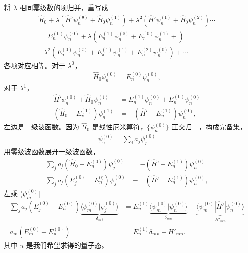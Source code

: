 将 $\lambda$ 相同幂级数的项归并，重写成
\begin{multline}
    \hat H_0 + \lambda \left(
        \hat H' \psi_n^{(0)} + \hat H_0 \psi_n^{(1)}
    \right) + \lambda^2 \left(
        \hat H' \psi_n^{(1)} + \hat H_0 \psi_n^{(2)}
    \right) \cdots \\ = 
    E_n^{(0)} \psi_n^{(0)} + \lambda \left(
        E_n^{(1)} \psi_n^{(0)} + E_n^{(0)} \psi_n^{(1)} + 
    \right) 
    \\+ \lambda^2 \left(
        E_n^{(0)} \psi_n^{(2)} +E_n^{(1)} \psi_n^{(1)} + E_n^{(2)} \psi_n^{(0)}
    \right) + \cdots
\end{multline}
各项对应相等。对于 $\lambda^0$，
\begin{align}
    \hat H_0 \psi_n^{(0)} = E_n^{(0)} \psi_n^{(0)},
\end{align}
对于 $\lambda^1$，
\begin{align}
    \hat H' \psi_n^{(0)} + \hat H_0 \psi_n^{(1)} &= E_n^{(1)} \psi_n^{(0)} + E_n^{(0)} \psi_n^{(0)} \\
    (\hat H_0 - E_n^{(1)})\psi_n^{(1)}&= - (\hat H' - E_n^{(1)}) \psi_n^{(0)},
\end{align}
左边是一级波函数。因为 $\hat H_0$ 是线性厄米算符，$\{\psi_n^{(0)}\}$ 正交归一，构成完备集，
\begin{align}
    \psi_n^{(0)} = \sum_j a_j \psi_j^{(0)}
\end{align}
用零级波函数展开一级波函数，
\begin{align}
    \sum_j a_j (\hat H_0 - E_n^{(0)}) \psi_j^{(0)} &= - (\hat H' - E_n^{(1)}) \psi_n^{(0)}\\
    \sum_j a_j (E_j^{(0)} - E_n^{0)}) \psi_j^{(0)} &= - (\hat H' - E_n^{(1)}) \psi_n^{(0)},
\end{align}
左乘 $\langle \psi_m^{(0)}|$,
\begin{align}
    \sum_j a_j (E_j^{(0)} - E_n^{(0)}) 
    \underbrace{\langle \psi_m^{(0)} | \psi_j^{(0)} \rangle}_{\delta_{mj}}
    &= E_n^{(1)} 
    \underbrace{\langle \psi_m^{(0)} | \psi_n^{(0)} \rangle}_{\delta_{mn}}
    - 
    \underbrace{\langle \psi_m^{(0)} | \hat H' | \psi_n^{(0)} \rangle}_{H'_{mn}} \\
    a_m (E_m^{(0)} - E_n^{(0)}) &= E_n^{(1)} \delta_{mn} - H'_{mn}, 
\end{align}
其中 $n$ 是我们希望求得的量子态。


